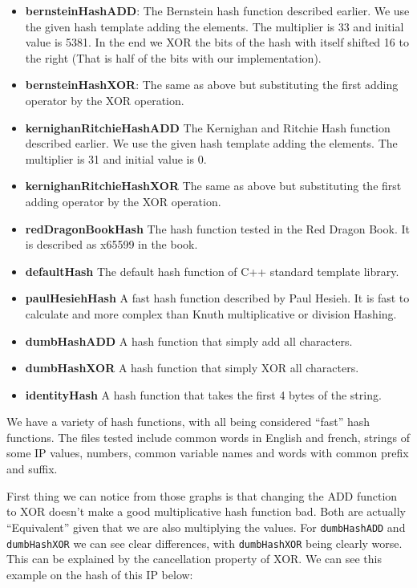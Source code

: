 \begin{itemize}
\item \textbf{bernsteinHashADD}: The Bernstein hash function described earlier. We use the given hash template adding the elements. The multiplier is 33 and initial value is 5381. In the end we XOR the bits of the hash with itself shifted 16 to the right (That is half of the bits with our implementation).
  
\item \textbf{bernsteinHashXOR}: The same as above but substituting the first adding operator by the XOR operation.

\item \textbf{kernighanRitchieHashADD} The Kernighan and Ritchie Hash function described earlier. We use the given hash template adding the elements. The multiplier is 31 and initial value is 0.

\item \textbf{kernighanRitchieHashXOR} The same as above but substituting the first adding operator by the XOR operation.

\item \textbf{redDragonBookHash} The hash function tested in the Red Dragon Book. It is described as x65599 in the book.

\item \textbf{defaultHash} The default hash function of C++ standard template library.

\item \textbf{paulHesiehHash} A fast hash function described by Paul Hesieh. It is fast to calculate and more complex than Knuth multiplicative or division Hashing.
  
\item \textbf{dumbHashADD} A hash function that simply add all characters.

\item \textbf{dumbHashXOR} A hash function that simply XOR all characters.

\item \textbf{identityHash} A hash function that takes the first 4 bytes of the string.  
\end{itemize}

We have a variety of hash functions, with all being considered ``fast'' hash functions. The files tested include common words in English and french, strings of some IP values, numbers, common variable names and words with common prefix and suffix.

First thing we can notice from those graphs is that changing the ADD function to XOR doesn't make a good multiplicative hash function bad. Both are actually ``Equivalent'' given that we are also multiplying the values. For \texttt{dumbHashADD} and \texttt{dumbHashXOR} we can see clear differences, with \texttt{dumbHashXOR} being clearly worse. This can be explained by the cancellation property of XOR. We can see this example on the hash of this IP below:

